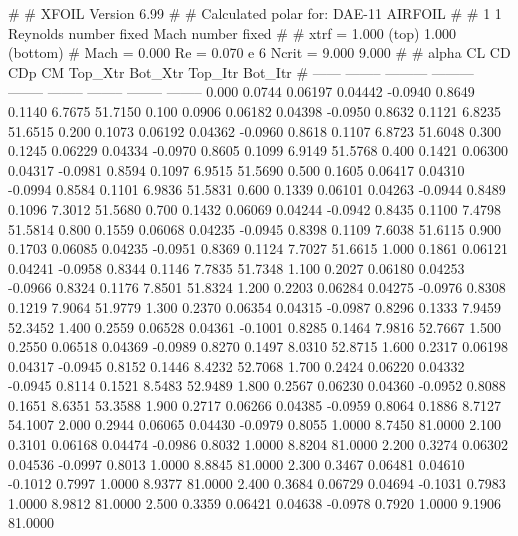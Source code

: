 #  
#       XFOIL         Version 6.99
#  
# Calculated polar for: DAE-11 AIRFOIL                                  
#  
# 1 1 Reynolds number fixed          Mach number fixed         
#  
# xtrf =   1.000 (top)        1.000 (bottom)  
# Mach =   0.000     Re =     0.070 e 6     Ncrit =   9.000  9.000
#  
#   alpha    CL        CD       CDp       CM     Top_Xtr  Bot_Xtr  Top_Itr  Bot_Itr
#  ------ -------- --------- --------- -------- -------- -------- -------- --------
   0.000   0.0744   0.06197   0.04442  -0.0940   0.8649   0.1140   6.7675  51.7150
   0.100   0.0906   0.06182   0.04398  -0.0950   0.8632   0.1121   6.8235  51.6515
   0.200   0.1073   0.06192   0.04362  -0.0960   0.8618   0.1107   6.8723  51.6048
   0.300   0.1245   0.06229   0.04334  -0.0970   0.8605   0.1099   6.9149  51.5768
   0.400   0.1421   0.06300   0.04317  -0.0981   0.8594   0.1097   6.9515  51.5690
   0.500   0.1605   0.06417   0.04310  -0.0994   0.8584   0.1101   6.9836  51.5831
   0.600   0.1339   0.06101   0.04263  -0.0944   0.8489   0.1096   7.3012  51.5680
   0.700   0.1432   0.06069   0.04244  -0.0942   0.8435   0.1100   7.4798  51.5814
   0.800   0.1559   0.06068   0.04235  -0.0945   0.8398   0.1109   7.6038  51.6115
   0.900   0.1703   0.06085   0.04235  -0.0951   0.8369   0.1124   7.7027  51.6615
   1.000   0.1861   0.06121   0.04241  -0.0958   0.8344   0.1146   7.7835  51.7348
   1.100   0.2027   0.06180   0.04253  -0.0966   0.8324   0.1176   7.8501  51.8324
   1.200   0.2203   0.06284   0.04275  -0.0976   0.8308   0.1219   7.9064  51.9779
   1.300   0.2370   0.06354   0.04315  -0.0987   0.8296   0.1333   7.9459  52.3452
   1.400   0.2559   0.06528   0.04361  -0.1001   0.8285   0.1464   7.9816  52.7667
   1.500   0.2550   0.06518   0.04369  -0.0989   0.8270   0.1497   8.0310  52.8715
   1.600   0.2317   0.06198   0.04317  -0.0945   0.8152   0.1446   8.4232  52.7068
   1.700   0.2424   0.06220   0.04332  -0.0945   0.8114   0.1521   8.5483  52.9489
   1.800   0.2567   0.06230   0.04360  -0.0952   0.8088   0.1651   8.6351  53.3588
   1.900   0.2717   0.06266   0.04385  -0.0959   0.8064   0.1886   8.7127  54.1007
   2.000   0.2944   0.06065   0.04430  -0.0979   0.8055   1.0000   8.7450  81.0000
   2.100   0.3101   0.06168   0.04474  -0.0986   0.8032   1.0000   8.8204  81.0000
   2.200   0.3274   0.06302   0.04536  -0.0997   0.8013   1.0000   8.8845  81.0000
   2.300   0.3467   0.06481   0.04610  -0.1012   0.7997   1.0000   8.9377  81.0000
   2.400   0.3684   0.06729   0.04694  -0.1031   0.7983   1.0000   8.9812  81.0000
   2.500   0.3359   0.06421   0.04638  -0.0978   0.7920   1.0000   9.1906  81.0000
